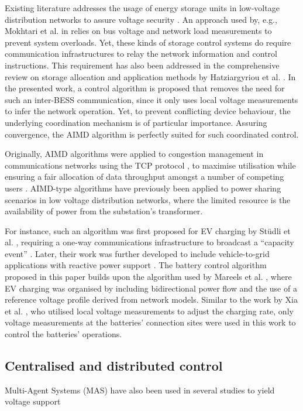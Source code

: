Existing literature addresses the usage of energy storage units in low-voltage distribution networks to assure voltage security \cite{Sugihara2013, Toledo2013, Marra2013, Mokhtari2013, Atia2016}.
An approach used by, e.g., Mokhtari et al. in \cite{Mokhtari2013} relies on bus voltage and network load measurements to prevent system overloads.
Yet, these kinds of storage control systems do require communication infrastructures to relay the network information and control instructions.
This requirement has also been addressed in the comprehensive review on storage allocation and application methods by Hatziargyriou et al. \cite{Hatziargyriou2015}.
In the presented work, a control algorithm is proposed that removes the need for such an inter-BESS communication, since it only uses local voltage measurements to infer the network operation.
Yet, to prevent conflicting device behaviour, the underlying coordination mechanism is of particular importance. Assuring convergence, the AIMD algorithm is perfectly suited for such coordinated control.

Originally, AIMD algorithms were applied to congestion management in communications networks using the TCP protocol \cite{Chiu1989}, to maximise utilisation while ensuring a fair allocation of data throughput amongst a number of competing users \cite{Wirth2014}.
AIMD-type algorithms have previously been applied to power sharing scenarios in low voltage distribution networks, where the limited resource is the availability of power from the substation's transformer.

For instance, such an algorithm was first proposed for EV charging by St{\"{u}}dli et al. \cite{Studli2012}, requiring a one-way communications infrastructure to broadcast a ``capacity event'' \cite{Studli2014, Studli2014a}. Later, their work was further developed to include vehicle-to-grid applications with reactive power support \cite {Studli2015}. The battery control algorithm proposed in this paper builds upon the algorithm used by Mareels et al. \cite{Mareels2014}, where EV charging was organised by including bidirectional power flow and the use of a reference voltage profile derived from network models. Similar to the work by Xia et al. \cite{Xia2014}, who utilised local voltage measurements to adjust the charging rate, only voltage measurements at the batteries' connection sites were used in this work to control the batteries' operations.

\subsection{Centralised and distributed control}
\label{ch-literature:subsec:centralised-and-distributed-control}



Multi-Agent Systems (MAS) have also been used in several studies to yield voltage support \cite{Baran2007}
